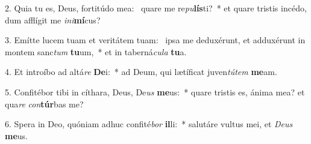 2. Quia tu es, Deus, fortitúdo mea: \dag\  quare me re\textit{pu}\textbf{lís}ti?~*  et quare tristis incédo, dum afflígit me \textit{in}\textit{i}\textbf{mí}cus?\

3. Emítte lucem tuam et veritátem tuam: \dag\  ipsa me deduxérunt, et adduxérunt in montem sanc\textit{tum} \textbf{tu}um,~*  et in taberná\textit{cu}\textit{la} \textbf{tu}a.\

4. Et introíbo ad altá\textit{re} \textbf{De}i:~*  ad Deum, qui lætíficat juven\textit{tú}\textit{tem} \textbf{me}am.\

5. Confitébor tibi in cíthara, Deus, De\textit{us} \textbf{me}us:~*  quare tristis es, ánima mea? et qua\textit{re} \textit{con}\textbf{túr}bas me?\

6. Spera in Deo, quóniam adhuc confité\textit{bor} \textbf{il}li:~*  salutáre vultus mei, et \textit{De}\textit{us} \textbf{me}us.\

